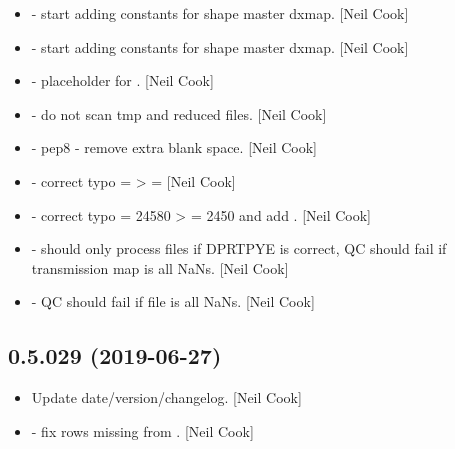 \documentclass[a4paper,10pt,english]{report}
\begin{document}
\begin{itemize}
\item {} 
 - start adding constants for shape master
dxmap. {[}Neil Cook{]}

\item {} 
 - start adding constants for shape master dxmap.
{[}Neil Cook{]}

\item {} 
 - placeholder for . {[}Neil
Cook{]}

\item {} 
 - do not scan tmp and reduced files. {[}Neil Cook{]}

\item {} 
 - pep8 - remove extra blank space. {[}Neil Cook{]}

\item {} 
 - correct typo  = 
\textendash{}\textgreater{}  =  {[}Neil Cook{]}

\item {} 
 - correct typo  = 24580 \textendash{}\textgreater{}
 = 2450 and add . {[}Neil
Cook{]}

\item {} 
  - should only process files if
DPRTPYE is correct, QC should fail if transmission map is all NaNs.
{[}Neil Cook{]}

\item {} 
 - QC should fail if file is all NaNs. {[}Neil
Cook{]}

\end{itemize}


\subsection{0.5.029 (2019-06-27)}
\label{\detokenize{misc/changelog:id107}}\begin{itemize}
\item {} 
Update date/version/changelog. {[}Neil Cook{]}

\item {} 
 - fix rows missing from . {[}Neil Cook{]}

\end{itemize}
\end{document}
